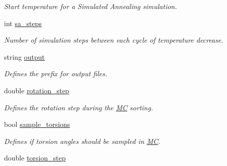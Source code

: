 \begin{DoxyCompactItemize}
\begin{DoxyCompactList}\small\item\em Start temperature for a Simulated Annealing simulation. \item\end{DoxyCompactList}\item 
\hypertarget{classPARSER_a6e650cc2d6f6f1965c8129c7defb2669}{
int \hyperlink{classPARSER_a6e650cc2d6f6f1965c8129c7defb2669}{sa\_\-steps}}
\label{classPARSER_a6e650cc2d6f6f1965c8129c7defb2669}

\begin{DoxyCompactList}\small\item\em Number of simulation steps between each cycle of temperature decrease. \item\end{DoxyCompactList}\item 
\hypertarget{classPARSER_a63171b5e4c3cb087c5c8cd892748f76a}{
string \hyperlink{classPARSER_a63171b5e4c3cb087c5c8cd892748f76a}{output}}
\label{classPARSER_a63171b5e4c3cb087c5c8cd892748f76a}

\begin{DoxyCompactList}\small\item\em Defines the prefix for output files. \item\end{DoxyCompactList}\item 
\hypertarget{classPARSER_aa5c532641ea632ca269db95617c128b2}{
double \hyperlink{classPARSER_aa5c532641ea632ca269db95617c128b2}{rotation\_\-step}}
\label{classPARSER_aa5c532641ea632ca269db95617c128b2}

\begin{DoxyCompactList}\small\item\em Defines the rotation step during the \hyperlink{classMC}{MC} sorting. \item\end{DoxyCompactList}\item 
\hypertarget{classPARSER_abb074a131360149b6c3d74123acdfd41}{
bool \hyperlink{classPARSER_abb074a131360149b6c3d74123acdfd41}{sample\_\-torsions}}
\label{classPARSER_abb074a131360149b6c3d74123acdfd41}

\begin{DoxyCompactList}\small\item\em Defines if torsion angles should be sampled in \hyperlink{classMC}{MC}. \item\end{DoxyCompactList}\item 
\hypertarget{classPARSER_a5ed3ab3f2f46e0372cb20b0e507703ff}{
double \hyperlink{classPARSER_a5ed3ab3f2f46e0372cb20b0e507703ff}{torsion\_\-step}}
\label{classPARSER_a5ed3ab3f2f46e0372cb20b0e507703ff}


\end{DoxyCompactItemize}
